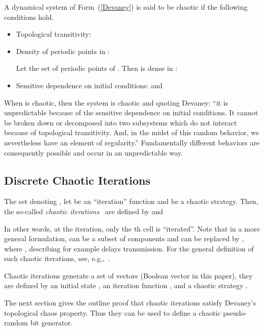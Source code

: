\documentclass[journal]{IEEEtran}
\begin{document}
\begin{definition}
 A dynamical system of Form~(\ref{Devaney}) is said to be chaotic if the following conditions hold.
\begin{itemize}
\item Topological transitivity:

\item Density of periodic points in :

Let  the set of periodic points of . Then  is dense in :


\item Sensitive dependence on initial conditions:
      and 
\end{itemize}

\end{definition}
When  is chaotic, then the system  is chaotic and quoting Devaney: ``it is unpredictable because of the sensitive dependence on initial conditions. It cannot be broken down or decomposed into two subsystems which do not interact because of topological transitivity. And, in the midst of this random behavior, we nevertheless have an element of regularity.'' Fundamentally different  behaviors  are  consequently possible and occur in an unpredictable way.





\subsection{Discrete Chaotic Iterations}
\label{Chaotic iterations}

\begin{definition}
The set  denoting , let  be an ``iteration'' function and  be a chaotic strategy. Then, the so-called \emph{chaotic iterations}~\cite{Robert1986} are defined by  and

\end{definition}
In other words, at the  iteration, only the th cell is
\textquotedblleft iterated\textquotedblright . Note that in a more general
formulation,  can be a subset of components and  can
be replaced by , where , describing for
example delays transmission. For the
general definition of such chaotic iterations, see, e.g.,~\cite{Robert1986}.

Chaotic iterations generate a set of vectors (Boolean vector in this paper),
they are defined by an initial state , an iteration function , and a chaotic strategy .

The next section gives the outline proof that chaotic iterations satisfy Devaney's topological chaos property. Thus they can be used to define a chaotic pseudo-random bit generator.
\end{document}
